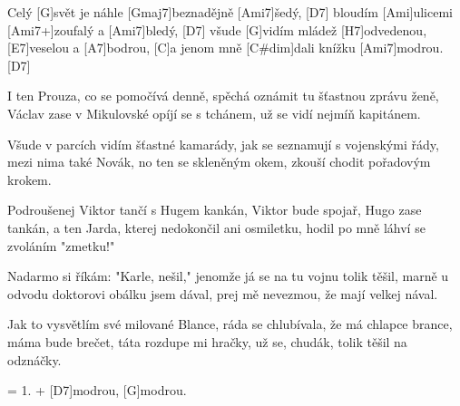 
\sloka
Celý [G]svět je náhle [Gmaj7]beznadějně [Ami7]šedý, [D7]
bloudím [Ami]ulicemi [Ami7+]zoufalý a [Ami7]bledý, [D7]
všude [G]vidím mládež [H7]odvedenou, [E7]veselou a [A7]bodrou,
[C]a jenom mně [C#dim]dali knížku [Ami7]modrou. [D7]

\sloka
I ten Prouza, co se pomočívá denně,
spěchá oznámit tu šťastnou zprávu ženě,
Václav zase v Mikulovské opíjí se s tchánem,
už se vidí nejmíň kapitánem.

\sloka
Všude v parcích vidím šťastné kamarády,
jak se seznamují s vojenskými řády,
mezi nima také Novák, no ten se skleněným okem,
zkouší chodit pořadovým krokem.

\sloka
Podroušenej Viktor tančí s Hugem kankán,
Viktor bude spojař, Hugo zase tankán,
a ten Jarda, kterej nedokončil ani osmiletku,
hodil po mně láhví se zvoláním "zmetku!"

\sloka
Nadarmo si říkám: "Karle, nešil,"
jenomže já se na tu vojnu tolik těšil,
marně u odvodu doktorovi obálku jsem dával,
prej mě nevezmou, že mají velkej nával.

\sloka
Jak to vysvětlím své milované Blance,
ráda se chlubívala, že má chlapce brance,
máma bude brečet, táta rozdupe mi hračky,
už se, chudák, tolik těšil na odznáčky.

\sloka
= 1.
+ [D7]modrou, [G]modrou.
